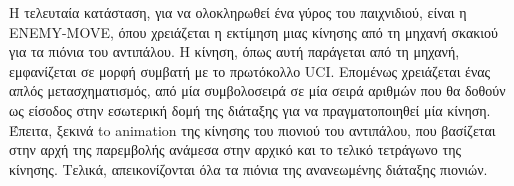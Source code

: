 Η τελευταία κατάσταση, για να ολοκληρωθεί ένα γύρος του παιχνιδιού, είναι η ENEMY-MOVE, όπου χρειάζεται η εκτίμηση μιας κίνησης από τη μηχανή σκακιού για τα πιόνια του αντιπάλου. Η κίνηση, όπως αυτή παράγεται από τη μηχανή, εμφανίζεται σε μορφή συμβατή με το πρωτόκολλο UCI. Επομένως χρειάζεται ένας απλός μετασχηματισμός, από μία συμβολοσειρά σε μία σειρά αριθμών που θα δοθούν ως είσοδος στην εσωτερική δομή της διάταξης για να πραγματοποιηθεί μία κίνηση.
Έπειτα, ξεκινά to animation της κίνησης του πιονιού του αντιπάλου, που βασίζεται στην αρχή της παρεμβολής ανάμεσα στην αρχικό και το τελικό τετράγωνο της κίνησης. Τελικά, απεικονίζονται όλα τα πιόνια της ανανεωμένης διάταξης πιονιών.


\begin{figure}[H]
    \centering
    
\end{figure}
